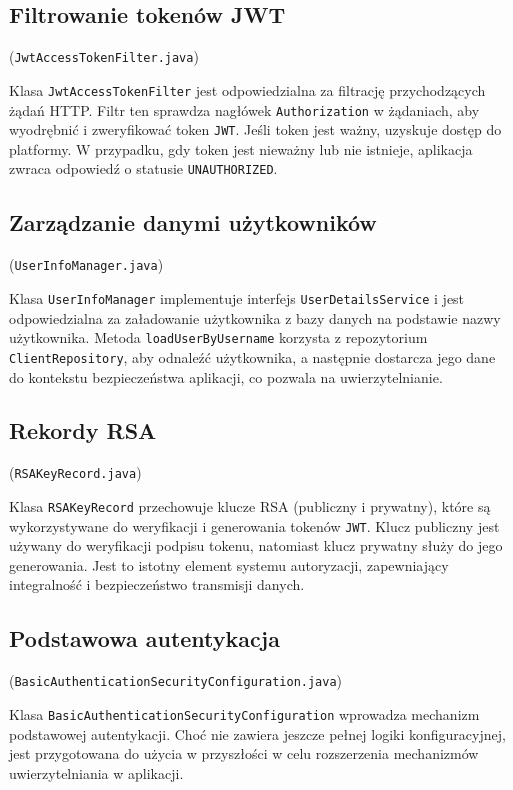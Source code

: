 \subsection{Filtrowanie tokenów JWT} (\texttt{JwtAccessTokenFilter.java})

Klasa \texttt{JwtAccessTokenFilter} jest odpowiedzialna za filtrację przychodzących żądań HTTP. Filtr ten sprawdza nagłówek \texttt{Authorization} w żądaniach, aby wyodrębnić i zweryfikować token \texttt{JWT}. Jeśli token jest ważny, uzyskuje dostęp do platformy. W przypadku, gdy token jest nieważny lub nie istnieje, aplikacja zwraca odpowiedź o statusie \texttt{UNAUTHORIZED}.

\subsection{Zarządzanie danymi użytkowników} (\texttt{UserInfoManager.java})

Klasa \texttt{UserInfoManager} implementuje interfejs \texttt{UserDetailsService} i jest odpowiedzialna za załadowanie użytkownika z bazy danych na podstawie nazwy użytkownika. Metoda \texttt{loadUserByUsername} korzysta z repozytorium \texttt{ClientRepository}, aby odnaleźć użytkownika, a następnie dostarcza jego dane do kontekstu bezpieczeństwa aplikacji, co pozwala na uwierzytelnianie.

\subsection{Rekordy RSA} (\texttt{RSAKeyRecord.java})

Klasa \texttt{RSAKeyRecord} przechowuje klucze RSA (publiczny i prywatny), które są wykorzystywane do weryfikacji i generowania tokenów \texttt{JWT}. Klucz publiczny jest używany do weryfikacji podpisu tokenu, natomiast klucz prywatny służy do jego generowania. Jest to istotny element systemu autoryzacji, zapewniający integralność i bezpieczeństwo transmisji danych.

\subsection{Podstawowa autentykacja} (\texttt{BasicAuthenticationSecurityConfiguration.java})

Klasa \texttt{BasicAuthenticationSecurityConfiguration} wprowadza mechanizm podstawowej autentykacji. Choć nie zawiera jeszcze pełnej logiki konfiguracyjnej, jest przygotowana do użycia w przyszłości w celu rozszerzenia mechanizmów uwierzytelniania w aplikacji.